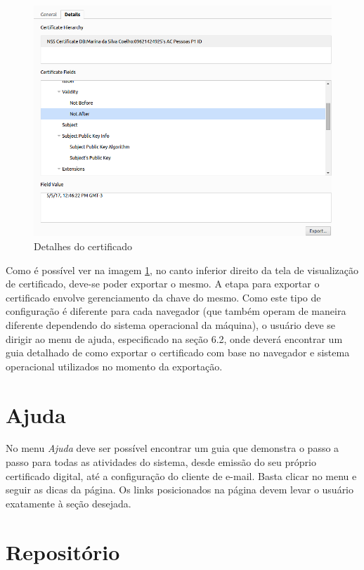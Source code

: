 \begin{figure}[ht]
     \centering
     \includegraphics[scale=0.5]{images/details.png}
     \caption{Detalhes do certificado}
     \label{fig:detailscert}
\end{figure}

Como é possível ver na imagem \ref{fig:detailscert}, no canto inferior direito da tela de visualização de certificado, deve-se poder exportar o mesmo. A etapa para exportar o certificado envolve gerenciamento da chave do mesmo. Como este tipo de configuração é diferente para cada navegador (que também operam de maneira diferente dependendo do sistema operacional da máquina), o usuário deve se dirigir ao menu de ajuda, especificado na seção 6.2, onde deverá encontrar um guia detalhado de como exportar o certificado com base no navegador e sistema operacional utilizados no momento da exportação.

\section{Ajuda}

No menu \textit{Ajuda} deve ser possível encontrar um guia que demonstra o passo a passo para todas as atividades do sistema, desde emissão do seu próprio certificado digital, até a configuração do cliente de e-mail. Basta clicar no menu e seguir as dicas da página. Os links posicionados na página devem levar o usuário exatamente à seção desejada.

\section{Repositório}

